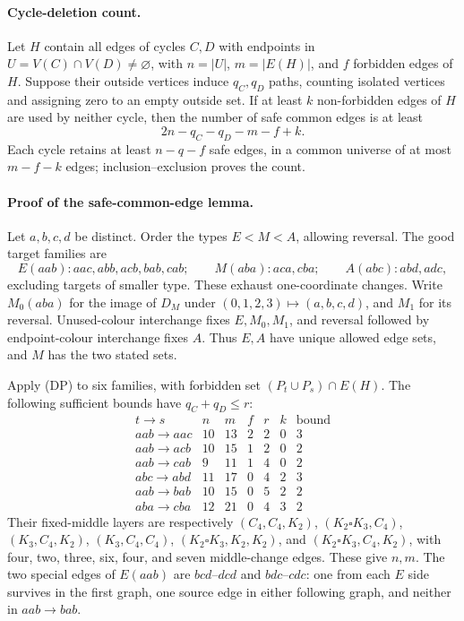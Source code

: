 \paragraph{Cycle-deletion count.}
Let $H$ contain all edges of cycles $C,D$ with endpoints in
$U=V(C)\cap V(D)\ne\varnothing$, with $n=|U|$, $m=|E(H)|$, and
$f$ forbidden edges of $H$.
Suppose their outside vertices induce $q_C,q_D$ paths, counting isolated
vertices and assigning zero to an empty outside set. If at least $k$
non-forbidden edges of $H$ are used by neither cycle, then the number
of safe common edges is at least
\[
 2n-q_C-q_D-m-f+k.                              \tag{DP}
\]
Each cycle retains at least $n-q-f$ safe edges, in a common universe
of at most $m-f-k$ edges; inclusion--exclusion proves the count.

\paragraph{Proof of the safe-common-edge lemma.}
Let $a,b,c,d$ be distinct. Order the types $E<M<A$, allowing reversal.
The good target families are
\[
E(aab):aac,abb,acb,bab,cab;\qquad
M(aba):aca,cba;\qquad A(abc):abd,adc,
\]
excluding targets of smaller type. These exhaust one-coordinate changes.
Write $M_0(aba)$ for the image of $D_M$ under
$(0,1,2,3)\mapsto(a,b,c,d)$, and $M_1$ for its reversal.
Unused-colour interchange fixes $E,M_0,M_1$, and reversal followed
by endpoint-colour interchange fixes $A$. Thus $E,A$ have unique
allowed edge sets, and $M$ has the two stated sets.

Apply (DP) to six families, with forbidden set
$(P_t\cup P_s)\cap E(H)$. The following sufficient bounds have
$q_C+q_D\le r$:
\[
\begin{array}{c|rrrrr|r}
t\to s&n&m&f&r&k&\text{bound}\\\hline
aab\to aac&10&13&2&2&0&3\\
aab\to acb&10&15&1&2&0&2\\
aab\to cab&9&11&1&4&0&2\\
abc\to abd&11&17&0&4&2&3\\
aab\to bab&10&15&0&5&2&2\\
aba\to cba&12&21&0&4&3&2
\end{array}                                                     \tag{CT}
\]
Their fixed-middle layers are respectively
$(C_4,C_4,K_2)$, $(K_2\square K_3,C_4)$, $(K_3,C_4,K_2)$,
$(K_3,C_4,C_4)$, $(K_2\square K_3,K_2,K_2)$, and
$(K_2\square K_3,C_4,K_2)$, with four, two, three, six, four,
and seven middle-change edges. These give $n,m$.
The two special edges of $E(aab)$ are $bcd$--$dcd$ and $bdc$--$cdc$:
one from each $E$ side survives in the first graph, one source edge
in either following graph, and neither in $aab\to bab$.

